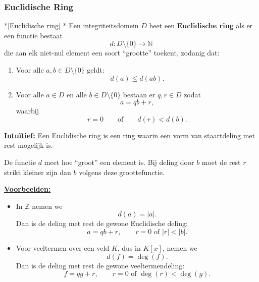 \subsubsection{Euclidische Ring}

\begin{nicedefinition}*[Euclidische ring]
    \nextpart[]*
    Een integriteitsdomein $D$ heet een \textcolor{PineGreen!75!black}{\textbf{Euclidische ring}} als er een functie bestaat
    \begin{equation*}
        d:D\setminus\{0\}\to \mathbb{N}
    \end{equation*}
    die aan elk niet-nul element een soort ``grootte'' toekent, zodanig dat:
    \begin{enumerate}
        \item Voor alle $a,b\in D\setminus\{0\}$ geldt:
        \begin{equation*}
            d(a)\leq d(ab).
        \end{equation*}

        \item Voor alle $a\in D$ en alle $b\in D\setminus\{0\}$ bestaan er $q,r\in D$ zodat
        \begin{equation*}
            a=qb+r,
        \end{equation*}
        waarbij
        \begin{equation*}
            r=0 \qquad \text{of} \qquad d(r)<d(b).
        \end{equation*}
    \end{enumerate}
\end{nicedefinition}

\textbf{\underline{Intuïtief:}} Een Euclidische ring is een ring waarin een vorm van staartdeling met rest mogelijk is.

De functie $d$ meet hoe ``groot'' een element is. Bij deling door $b$ moet de rest $r$ strikt kleiner zijn dan $b$ volgens deze groottefunctie.

\textbf{\underline{Voorbeelden:}}
\begin{itemize}
    \item In $\mathbb{Z}$ nemen we
    \[
        d(a)=|a|.
    \]
    Dan is de deling met rest de gewone Euclidische deling:
    \[
        a=qb+r,
        \qquad
        r=0 \text{ of } |r|<|b|.
    \]

    \item Voor veeltermen over een veld $K$, dus in $K[x]$, nemen we
    \[
        d(f)=\deg(f).
    \]
    Dan is de deling met rest de gewone veeltermendeling:
    \[
        f=qg+r,
        \qquad
        r=0 \text{ of } \deg(r)<\deg(g).
    \]
\end{itemize}

